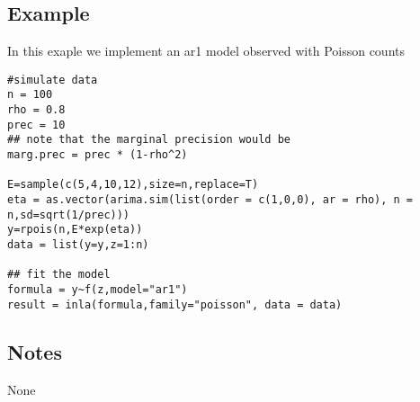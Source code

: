 \documentclass[a4paper,11pt]{article}
\begin{document}
\subsection*{Example}

In this exaple we implement an ar1 model observed with Poisson counts
\begin{verbatim}
#simulate data
n = 100
rho = 0.8
prec = 10
## note that the marginal precision would be
marg.prec = prec * (1-rho^2)

E=sample(c(5,4,10,12),size=n,replace=T)
eta = as.vector(arima.sim(list(order = c(1,0,0), ar = rho), n = n,sd=sqrt(1/prec)))
y=rpois(n,E*exp(eta))
data = list(y=y,z=1:n)

## fit the model
formula = y~f(z,model="ar1")
result = inla(formula,family="poisson", data = data)
\end{verbatim}


\subsection*{Notes}

None
\end{document}
